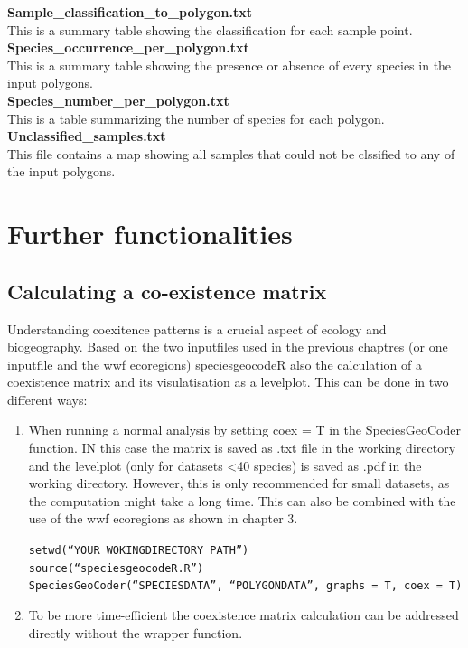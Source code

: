 \documentclass[a4paper,titlepage,11pt]{scrreprt}
\begin{document}
\textbf{Sample\_classification\_to\_polygon.txt}\\
This is a summary table showing the classification for each sample point.\\
\textbf{Species\_occurrence\_per\_polygon.txt}\\
This is a summary table showing the presence or absence of every species in the input polygons.\\
\textbf{Species\_number\_per\_polygon.txt}\\
This is a table summarizing the number of species for each polygon.\\
\textbf{Unclassified\_samples.txt}\\
This file contains a map showing all samples that could not be clssified to any of the input polygons.\\

\chapter{Further functionalities} \label{further}
\section{Calculating a co-existence matrix}
Understanding coexitence patterns is a crucial aspect of ecology and biogeography. Based on the two inputfiles used in the previous chaptres (or one inputfile and the wwf ecoregions) speciesgeocodeR also the calculation of a coexistence matrix and its visulatisation as a levelplot. This can be done in two different ways:

\begin{enumerate}
\item{When running a normal analysis by setting coex = T in the SpeciesGeoCoder function. IN this case the matrix is saved as .txt file in the working directory and the levelplot (only for datasets \textless 40 species) is saved as .pdf in the working directory.  However, this is only recommended for small datasets, as the computation might take a long time. This can also be combined with the use of the wwf ecoregions as shown in chapter 3.}

\texttt{setwd(``YOUR WOKINGDIRECTORY PATH'')}\\
\texttt{source(``speciesgeocodeR.R'')}\\
\texttt{SpeciesGeoCoder(``SPECIESDATA'', ``POLYGONDATA'',  graphs = T, coex = T)}

\item{To be more time-efficient the coexistence matrix calculation can be addressed directly without the wrapper function.}
\end{enumerate}
\end{document}
